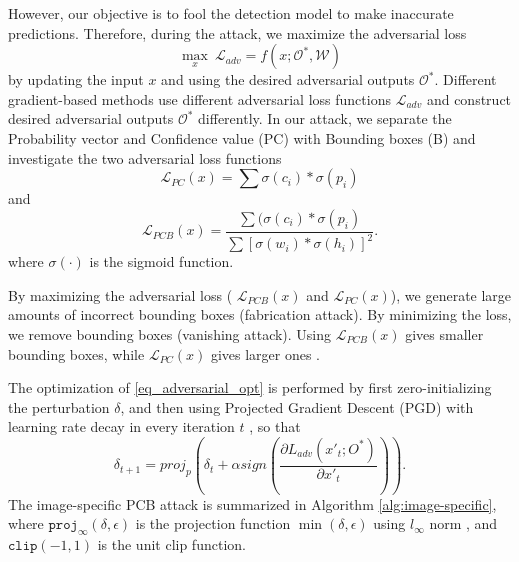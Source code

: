However, our objective is to fool the detection model to make inaccurate predictions. Therefore, during the attack, we maximize the adversarial loss 
\begin{equation}
\label{eq_adversarial_opt}
\max_{x} \ \mathcal{L}_{adv} = f(x; \mathcal{O}^{\ast}, \mathcal{W})
\end{equation}
by updating the input $x$ and using the desired adversarial outputs $\mathcal{O}^{\ast}$. Different gradient-based methods use different adversarial loss functions $\mathcal{L}_{adv}$ and construct desired adversarial outputs $\mathcal{O}^{\ast}$ differently. In our attack, we separate the Probability vector and Confidence value (PC) with Bounding boxes (B) and investigate the two adversarial loss functions
\begin{equation}
\mathcal{L}_{PC}(x) = \sum{\sigma(c_i) * \sigma(p_i)}
\end{equation}
and
\begin{equation}
\mathcal{L}_{PCB}(x) = \frac{\sum{(\sigma(c_i) * \sigma(p_i)}}{\sum{[\sigma(w_i) * \sigma(h_i)]^2}}.
\end{equation}
where $\sigma(\cdot)$ is the sigmoid function. 

By maximizing the adversarial loss ( $\mathcal{L}_{PCB}(x)$ and $\mathcal{L}_{PC}(x)$), we generate large amounts of incorrect bounding boxes (fabrication attack). By minimizing the loss, we remove bounding boxes (vanishing attack).  Using $\mathcal{L}_{PCB}(x)$ gives smaller bounding boxes, while $\mathcal{L}_{PC}(x)$ gives larger ones .

The optimization of \eqref{eq_adversarial_opt} is performed by first zero-initializing the perturbation $\delta$, and then using Projected Gradient Descent (PGD) \citep{madry2017towards} with learning rate decay  in every iteration $t$ , so that 
\begin{equation}
\delta_{t+1} = proj_p(\delta_{t} + \alpha sign(\frac{\partial L_{adv}(x'_{t};O^*)}{\partial x'_{t}} )).
\end{equation}
The image-specific PCB attack is summarized in Algorithm \ref{alg:image-specific}, where 
$\texttt{proj}_{\infty}(\delta,\epsilon)$ is the projection function $\min(\delta,\epsilon)$  using $l_{\infty}$ norm , and $\texttt{clip}(-1, 1)$ is the unit clip function.

